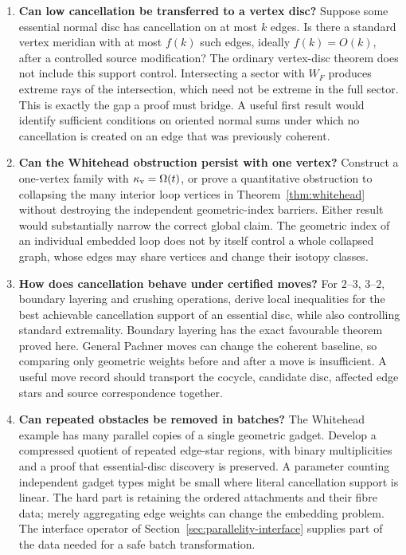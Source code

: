 \begin{enumerate}[label=G\arabic*.]
\item \textbf{Can low cancellation be transferred to a vertex disc?}
Suppose some essential normal disc has cancellation on at most $k$
edges. Is there a standard vertex meridian with at most $f(k)$ such
edges, ideally $f(k)=O(k)$, after a controlled source modification?
The ordinary vertex-disc theorem does not include this support control.
Intersecting a sector with $W_F$ produces extreme rays of the intersection,
which need not be extreme in the full sector. This is exactly the gap a
proof must bridge. A useful first result would identify sufficient
conditions on oriented normal sums under which no cancellation is created
on an edge that was previously coherent.

\item \textbf{Can the Whitehead obstruction persist with one vertex?}
Construct a one-vertex family with $\kappa_{\mathrm{v}}=\Omega(t)$, or prove a
quantitative obstruction to collapsing the many interior loop vertices
in Theorem~\ref{thm:whitehead} without destroying the independent
geometric-index barriers. Either result would substantially narrow the
correct global claim. The geometric index of an individual embedded loop
does not by itself control a whole collapsed graph, whose edges may share
vertices and change their isotopy classes.

\item \textbf{How does cancellation behave under certified moves?}
For $2$--$3$, $3$--$2$, boundary layering and crushing operations, derive
local inequalities for the best achievable cancellation support of an
essential disc, while also controlling standard extremality. Boundary
layering has the exact favourable theorem proved here. General Pachner
moves can change the coherent baseline, so comparing only geometric
weights before and after a move is insufficient. A useful move record
should transport the cocycle, candidate disc, affected edge stars and
source correspondence together.

\item \textbf{Can repeated obstacles be removed in batches?}
The Whitehead example has many parallel copies of a single geometric
gadget. Develop a compressed quotient of repeated edge-star regions,
with binary multiplicities and a proof that essential-disc discovery is
preserved. A parameter counting independent gadget types might be small
where literal cancellation support is linear. The hard part is retaining
the ordered attachments and their fibre data; merely aggregating edge
weights can change the embedding problem. The interface operator of
Section~\ref{sec:parallelity-interface} supplies part of the data needed
for a safe batch transformation.


\end{enumerate}
